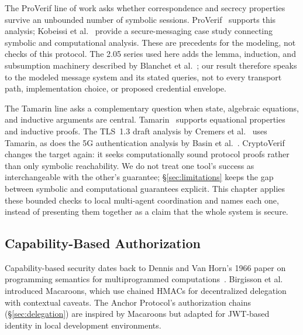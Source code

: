 \documentclass[11pt,a4paper]{article}
\theoremstyle{definition}
\begin{document}
The ProVerif line of work asks whether correspondence and secrecy properties
survive an unbounded number of symbolic sessions. ProVerif~
supports this analysis; Kobeissi et al.~ provide
a secure-messaging case study connecting symbolic and computational analysis.
These are precedents for the modeling, not checks of this protocol. The
2.05 series used here adds the lemma, induction, and subsumption machinery
described by Blanchet et al.~; our result therefore
speaks to the modeled message system and its stated queries, not to every
transport path, implementation choice, or proposed credential envelope.

The Tamarin line asks a complementary question when state, algebraic
equations, and inductive arguments are central. Tamarin~
supports equational properties and inductive proofs. The TLS~1.3 draft analysis
by Cremers et al.~ uses Tamarin, as does the
5G authentication analysis by Basin et al.~.
CryptoVerif~ changes the target again:
it seeks computationally sound protocol proofs rather than only symbolic
reachability. We do not treat one tool's success as interchangeable with the
other's guarantee; \S\ref{sec:limitations} keeps the gap between symbolic and
computational guarantees explicit. This chapter applies these bounded checks to local
multi-agent coordination and names each one, instead of presenting them together
as a claim that the whole system is secure.

\subsection{Capability-Based Authorization}\label{app:capability-auth}

Capability-based security dates back to Dennis and Van Horn's 1966 paper on programming semantics for multiprogrammed computations~. Birgisson et al.~ introduced Macaroons, which use chained HMACs for decentralized delegation with contextual caveats. The Anchor Protocol's authorization chains (\S\ref{sec:delegation}) are inspired by Macaroons but adapted for JWT-based identity in local development environments.
\end{document}
